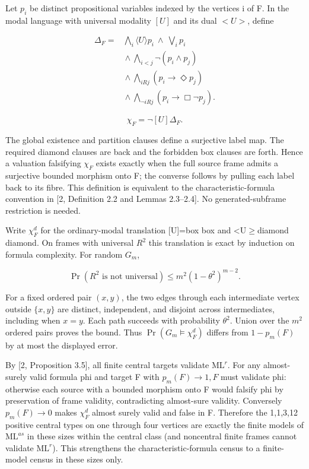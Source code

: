 \documentclass[11pt]{article}
\begin{document}
Let $p_{i}$ be distinct propositional variables indexed by the vertices i of F. In the modal language with universal modality $[U]$ and its dual $<U>$, define

\[
\begin{aligned}
\Delta_F={}&\bigwedge_i\langle U\rangle p_i
\ \land\ \bigvee_i p_i\\
&{}\land\bigwedge_{i<j}\neg(p_i\land p_j)\\
&{}\land\bigwedge_{iRj}(p_i\to\Diamond p_j)\\
&{}\land\bigwedge_{\neg iRj}(p_i\to\Box\neg p_j).
\end{aligned}
\]

\[
\chi_F=\neg[U]\Delta_F.
\]

The global existence and partition clauses define a surjective label map. The required diamond clauses are back and the forbidden box clauses are forth. Hence a valuation falsifying $\chi _{F}$ exists exactly when the full source frame admits a surjective bounded morphism onto F; the converse follows by pulling each label back to its fibre. This definition is equivalent to the characteristic-formula convention in [2, Definition 2.2 and Lemmas 2.3--2.4]. No generated-subframe restriction is needed.

Write $\chi _{F}^{d}$ for the ordinary-modal translation [U]=box box and <U\ensuremath{\geq}diamond diamond. On frames with universal $R^{2}$ this translation is exact by induction on formula complexity. For random $G_{m}$,

\[
\Pr(R^2\text{ is not universal})\leq m^2(1-\theta^2)^{m-2}.
\]

For a fixed ordered pair $(x,y)$, the two edges through each intermediate vertex outside $\{x,y\}$ are distinct, independent, and disjoint across intermediates, including when $x=y$. Each path succeeds with probability $\theta ^{2}$. Union over the $m^{2}$ ordered pairs proves the bound. Thus $\Pr(G_m\models\chi_F^d)$ differs from $1-p_{m}(F)$ by at most the displayed error.

By [2, Proposition 3.5], all finite central targets validate $\mathrm{ML}^{r}$. For any almost-surely valid formula phi and target F with $p_{m}(F)\to 1, F$ must validate phi: otherwise each source with a bounded morphism onto F would falsify phi by preservation of frame validity, contradicting almost-sure validity. Conversely $p_{m}(F)\to 0$ makes $\chi _{F}^{d}$ almost surely valid and false in F. Therefore the 1,1,3,12 positive central types on one through four vertices are exactly the finite models of $\mathrm{ML}^{as}$ in these sizes within the central class (and noncentral finite frames cannot validate $\mathrm{ML}^{r}$). This strengthens the characteristic-formula census to a finite-model census in these sizes only.
\end{document}
